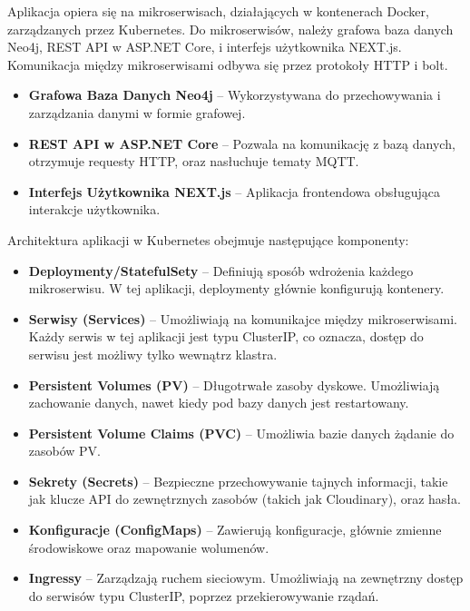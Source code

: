 \documentclass[12pt,a4paper]{article}
\begin{document}
Aplikacja opiera się na mikroserwisach, działających w kontenerach Docker, zarządzanych przez Kubernetes. Do mikroserwisów, należy grafowa baza danych Neo4j, REST API w ASP.NET Core, i interfejs użytkownika NEXT.js. Komunikacja między mikroserwisami odbywa się przez protokoły HTTP i bolt.

\begin{itemize}
  \item \textbf{Grafowa Baza Danych Neo4j} -- Wykorzystywana do przechowywania i zarządzania danymi w formie grafowej.
  \item \textbf{REST API w ASP.NET Core} -- Pozwala na komunikację z bazą danych, otrzymuje requesty HTTP, oraz nasłuchuje tematy MQTT.
  \item \textbf{Interfejs Użytkownika NEXT.js} -- Aplikacja frontendowa obsługująca interakcje użytkownika.
\end{itemize}

Architektura aplikacji w Kubernetes obejmuje następujące komponenty:

\begin{itemize}
  \item \textbf{Deploymenty/StatefulSety} -- Definiują sposób wdrożenia każdego mikroserwisu. W tej aplikacji, deploymenty głównie konfigurują kontenery.
  \item \textbf{Serwisy (Services)} -- Umożliwiają na komunikajce między mikroserwisami. Każdy serwis w tej aplikacji jest typu ClusterIP, co oznacza, dostęp do serwisu jest możliwy tylko wewnątrz klastra.
  \item \textbf{Persistent Volumes (PV)} -- Długotrwałe zasoby dyskowe. Umożliwiają zachowanie danych, nawet kiedy pod bazy danych jest restartowany.
  \item \textbf{Persistent Volume Claims (PVC)} -- Umożliwia bazie danych żądanie do zasobów PV.
  \item \textbf{Sekrety (Secrets)} -- Bezpieczne przechowywanie tajnych informacji, takie jak klucze API do zewnętrznych zasobów (takich jak Cloudinary), oraz hasła.
  \item \textbf{Konfiguracje (ConfigMaps)} -- Zawierują konfiguracje, głównie zmienne środowiskowe oraz mapowanie wolumenów.
  \item \textbf{Ingressy} -- Zarządzają ruchem sieciowym. Umożliwiają na zewnętrzny dostęp do serwisów typu ClusterIP, poprzez przekierowywanie rządań.
\end{itemize}

\newpage
\end{document}
